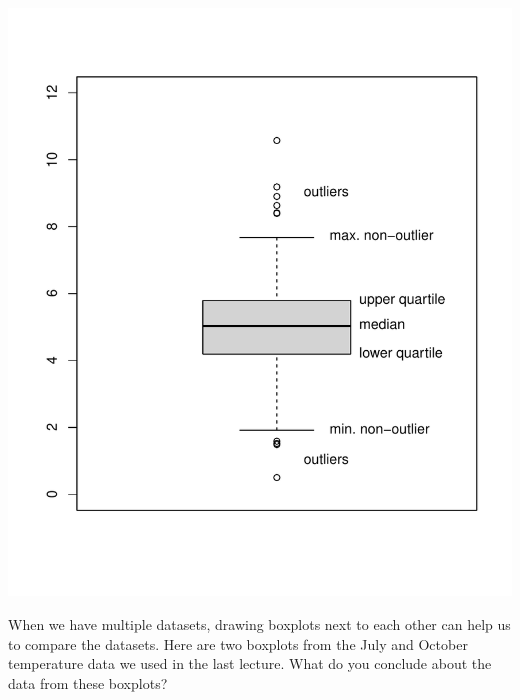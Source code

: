 \documentclass[
  a4paper,
]{book}
\newenvironment{Shaded}{\begin{snugshade}}{\end{snugshade}}
\newcommand{\AttributeTok}[1]{\textcolor[rgb]{0.77,0.63,0.00}{#1}}
\newcommand{\FunctionTok}[1]{\textcolor[rgb]{0.00,0.00,0.00}{#1}}
\newcommand{\NormalTok}[1]{#1}
\newcommand{\SpecialCharTok}[1]{\textcolor[rgb]{0.00,0.00,0.00}{#1}}
\newcommand{\StringTok}[1]{\textcolor[rgb]{0.31,0.60,0.02}{#1}}
\theoremstyle{definition}
\theoremstyle{definition}
\theoremstyle{definition}
\theoremstyle{definition}
\theoremstyle{remark}
\begin{document}
\begin{center}\includegraphics{math1710_files/figure-latex/boxplot1-1} \end{center}

When we have multiple datasets, drawing boxplots next to each other can help us to compare the datasets. Here are two boxplots from the July and October temperature data we used in the last lecture. What do you conclude about the data from these boxplots?

\begin{Shaded}
\end{Shaded}
\end{document}
